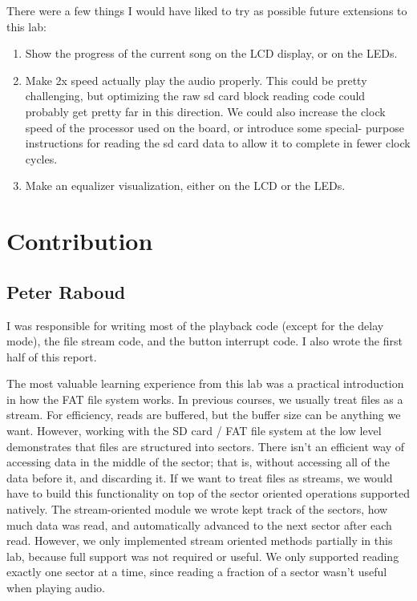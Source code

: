 \documentclass[12pt]{article}
\begin{document}
There were a few things I would have liked to try as possible future extensions
to this lab:
\begin{enumerate}
\item Show the progress of the current song on the LCD display, or on the LEDs.
\item Make 2x speed actually play the audio properly. This could be pretty
	challenging, but optimizing the raw sd card block reading code could
	probably get pretty far in this direction. We could also increase the
	clock speed of the processor used on the board, or introduce some special-
	purpose instructions for reading the sd card data to allow it to complete
	in fewer clock cycles.
\item Make an equalizer visualization, either on the LCD or the LEDs.
\end{enumerate}

\section{Contribution}
\subsection{Peter Raboud}
I was responsible for writing most of the playback code (except for the delay mode),
the file stream code, and the button interrupt code.
I also wrote the first half of this report.

The most valuable learning experience from this lab was a practical introduction
in how the FAT file system works.
In previous courses, we usually treat files as a stream.
For efficiency, reads are buffered, but the buffer size can be anything we want.
However, working with the SD card / FAT file system at the low level demonstrates
that files are structured into sectors.
There isn't an efficient way of accessing data in the middle of the sector; that
is, without accessing all of the data before it, and discarding it.
If we want to treat files as streams, we would have to build this functionality
on top of the sector oriented operations supported natively.
The stream-oriented module we wrote kept track of the sectors, how much data was
read, and automatically advanced to the next sector after each read.
However, we only implemented stream oriented methods partially in this lab,
because full support was not required or useful.
We only supported reading exactly one sector at a time, since reading a fraction
of a sector wasn't useful when playing audio.
\end{document}
